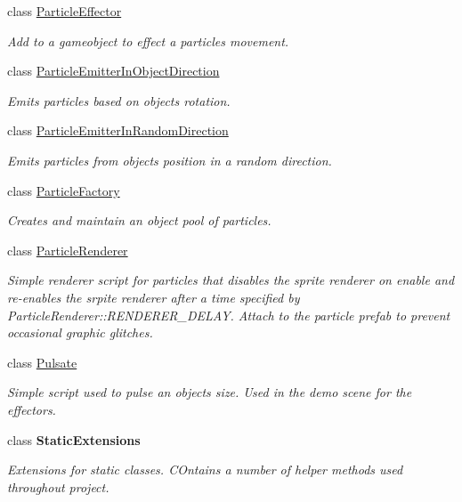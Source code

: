 \begin{DoxyCompactItemize}
class \hyperlink{class_p_e2_d_1_1_particle_effector}{Particle\+Effector}
\begin{DoxyCompactList}\small\item\em Add to a gameobject to effect a particles movement. \end{DoxyCompactList}\item 
class \hyperlink{class_p_e2_d_1_1_particle_emitter_in_object_direction}{Particle\+Emitter\+In\+Object\+Direction}
\begin{DoxyCompactList}\small\item\em Emits particles based on objects rotation. \end{DoxyCompactList}\item 
class \hyperlink{class_p_e2_d_1_1_particle_emitter_in_random_direction}{Particle\+Emitter\+In\+Random\+Direction}
\begin{DoxyCompactList}\small\item\em Emits particles from objects position in a random direction. \end{DoxyCompactList}\item 
class \hyperlink{class_p_e2_d_1_1_particle_factory}{Particle\+Factory}
\begin{DoxyCompactList}\small\item\em Creates and maintain an object pool of particles. \end{DoxyCompactList}\item 
class \hyperlink{class_p_e2_d_1_1_particle_renderer}{Particle\+Renderer}
\begin{DoxyCompactList}\small\item\em Simple renderer script for particles that disables the sprite renderer on enable and re-\/enables the srpite renderer after a time specified by Particle\+Renderer\+::\+R\+E\+N\+D\+E\+R\+E\+R\+\_\+\+D\+E\+L\+A\+Y. Attach to the particle prefab to prevent occasional graphic glitches. \end{DoxyCompactList}\item 
class \hyperlink{class_p_e2_d_1_1_pulsate}{Pulsate}
\begin{DoxyCompactList}\small\item\em Simple script used to pulse an objects size. Used in the demo scene for the effectors. \end{DoxyCompactList}\item 
class {\bfseries Static\+Extensions}
\begin{DoxyCompactList}\small\item\em Extensions for static classes. C\+Ontains a number of helper methods used throughout project. \end{DoxyCompactList}\end{DoxyCompactItemize}
